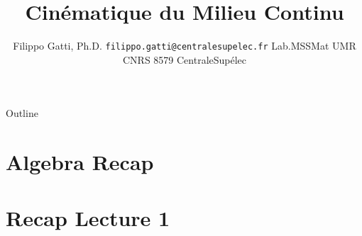 \documentclass[usenames,dvipsnames]{beamer}
\title[CentraleSupélec]{Cinématique du Milieu Continu}
\author[Filippo Gatti]{
  Filippo Gatti, Ph.D.
  \pdfnewline
  \texttt{filippo.gatti@centralesupelec.fr}
  \pdfnewline  Lab.MSSMat UMR CNRS 8579
  \pdfnewline CentraleSupélec
}
\institute{Mechanics}
\newcommand{\writeup}{.}
\newcommand{\presentations}{\writeup}
\newcommand{\runfolder}{\presentations}
\newcommand{\runsections}{\runfolder/sections}
\begin{document}
\begin{frame}
\titlepage
\end{frame}

\begin{frame}{Outline}
\tableofcontents
\end{frame}

\section{Algebra Recap}


\section{Recap Lecture 1}


% 


%
%
%
%
%
%
%
\end{document}
